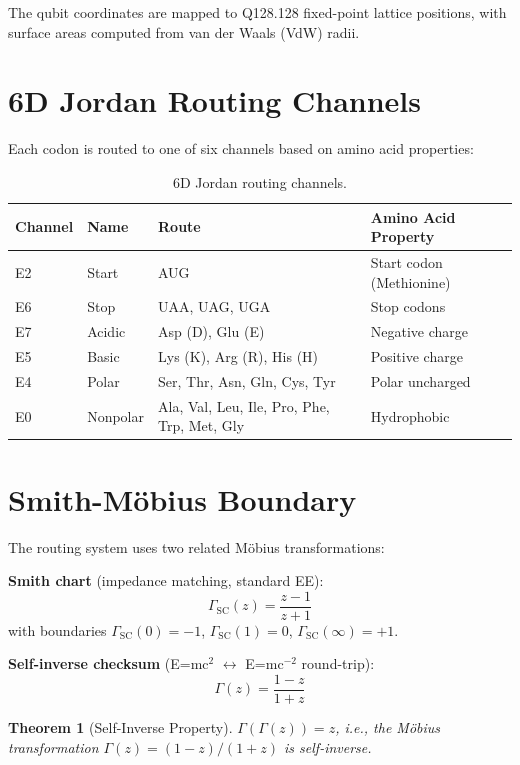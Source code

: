 \documentclass[11pt]{article}
\newtheorem{theorem}{Theorem}
\begin{document}
The qubit coordinates are mapped to Q128.128 fixed-point lattice positions, with surface areas computed from van der Waals (VdW) radii.

\section{6D Jordan Routing Channels}

Each codon is routed to one of six channels based on amino acid properties:

\begin{table}[ht]
\centering
\caption{6D Jordan routing channels.}
\label{tab:channels}
\begin{tabular}{lllp{6cm}}
\toprule
Channel & Name & Route & Amino Acid Property \\
\midrule
E2 & Start & AUG & Start codon (Methionine) \\
E6 & Stop & UAA, UAG, UGA & Stop codons \\
E7 & Acidic & Asp (D), Glu (E) & Negative charge \\
E5 & Basic & Lys (K), Arg (R), His (H) & Positive charge \\
E4 & Polar & Ser, Thr, Asn, Gln, Cys, Tyr & Polar uncharged \\
E0 & Nonpolar & Ala, Val, Leu, Ile, Pro, Phe, Trp, Met, Gly & Hydrophobic \\
\bottomrule
\end{tabular}
\end{table}

\section{Smith-M\"obius Boundary}

The routing system uses two related M\"obius transformations:

\textbf{Smith chart} (impedance matching, standard EE):
\begin{equation}
\Gamma_{\text{SC}}(z) = \frac{z - 1}{z + 1}
\end{equation}
with boundaries $\Gamma_{\text{SC}}(0) = -1$, $\Gamma_{\text{SC}}(1) = 0$, $\Gamma_{\text{SC}}(\infty) = +1$.

\textbf{Self-inverse checksum} (E=mc$^2$ $\leftrightarrow$ E=mc$^{-2}$ round-trip):
\begin{equation}
\Gamma(z) = \frac{1 - z}{1 + z}
\end{equation}

\begin{theorem}[Self-Inverse Property]
$\Gamma(\Gamma(z)) = z$, i.e., the M\"obius transformation $\Gamma(z) = (1-z)/(1+z)$ is self-inverse.
\end{theorem}
\end{document}
